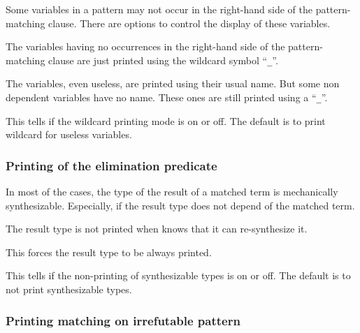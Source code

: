 Some variables in a pattern may not occur in the right-hand side of
the pattern-matching clause.  There are options to control the
display of these variables.

\begin{quote}
{}
\end{quote}
The variables having no occurrences in the right-hand side of the
pattern-matching clause are just printed using the wildcard symbol
``{\tt \_}''.

\begin{quote}
{}
\end{quote}
The variables, even useless, are printed using their usual name. But some
non dependent variables have no name. These ones are still printed
using a ``{\tt \_}''.

\begin{quote}
{}
\end{quote}
This tells if the wildcard printing mode is on or off. The default is
to print wildcard for useless variables.

\subsubsection{Printing of the elimination predicate
}

In most of the cases, the type of the result of a matched term is
mechanically synthesizable. Especially, if the result type does not
depend of the matched term.

\begin{quote}
{}
\end{quote}
The result type is not printed when {\Coq} knows that it can
re-synthesize it.

\begin{quote}
{}
\end{quote}
This forces the result type to be always printed.

\begin{quote}
{}
\end{quote}
This tells if the non-printing of synthesizable types is on or off.
The default is to not print synthesizable types.

\subsubsection{Printing matching on irrefutable pattern
\label{AddPrintingLet}
}

